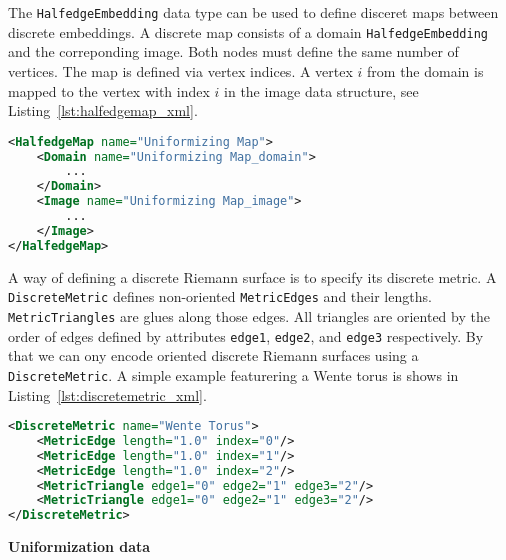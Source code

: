 \documentclass[Thesis.tex]{subfiles}
\begin{document}
The {\tt HalfedgeEmbedding} data type can be used to define disceret maps between discrete embeddings. A discrete map consists of
a domain {\tt HalfedgeEmbedding} and the correponding image. Both nodes must define the same number of vertices. The map is defined
via vertex indices. A vertex $i$ from the domain is mapped to the vertex with index $i$ in the image data structure, see Listing~\ref{lst:halfedgemap_xml}.

\begin{lstlisting}[label=lst:halfedgemap_xml, caption={A discrete map is given by a pair of {\tt HalfedgeEmbedding}s, the {\tt Domain} and {\tt Image} of the map. Both are of type {\tt HalfedgeEmbedding}.}, numbers=none, language=XML, captionpos=b]
<HalfedgeMap name="Uniformizing Map">
	<Domain name="Uniformizing Map_domain">
		...
	</Domain>
	<Image name="Uniformizing Map_image">
		...
	</Image>
</HalfedgeMap>
\end{lstlisting}

A way of defining a discrete Riemann surface is to specify its discrete metric. A {\tt DiscreteMetric} defines non-oriented {\tt MetricEdges}
and their lengths. {\tt MetricTriangles} are glues along those edges. All triangles are oriented by the order of edges defined by attributes
{\tt edge1}, {\tt edge2}, and {\tt edge3} respectively. By that we can ony encode oriented discrete Riemann surfaces using a {\tt DiscreteMetric}.
A simple example featurering a Wente torus is shows in Listing~\ref{lst:discretemetric_xml}.

\begin{lstlisting}[label=lst:discretemetric_xml, caption={A wente torus given by a discrete metric. Vertices are given implictly
by following the order of triangle glueings.}, numbers=none, language=XML, captionpos=b]
<DiscreteMetric name="Wente Torus">
	<MetricEdge length="1.0" index="0"/>
	<MetricEdge length="1.0" index="1"/>
	<MetricEdge length="1.0" index="2"/>
	<MetricTriangle edge1="0" edge2="1" edge3="2"/>
	<MetricTriangle edge1="0" edge2="1" edge3="2"/>
</DiscreteMetric>
\end{lstlisting}

{\bf Uniformization data} 
\end{document}
